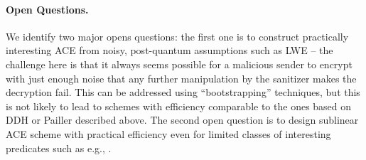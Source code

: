 \documentclass{llncs}
\begin{document}
\paragraph{Open Questions.} We identify two major opens questions: the first one is to construct practically interesting ACE from noisy, post-quantum assumptions such as LWE -- the challenge here is that it always seems possible for a malicious sender to encrypt with just enough noise that any further manipulation by the sanitizer makes the decryption fail. This can be addressed using ``bootstrapping'' techniques, but this is not likely to lead to schemes with efficiency comparable to the ones based on DDH or Pailler described above. The second open question is to design sublinear ACE scheme with practical efficiency even for limited classes of interesting predicates such as e.g., .


 
\end{document}
